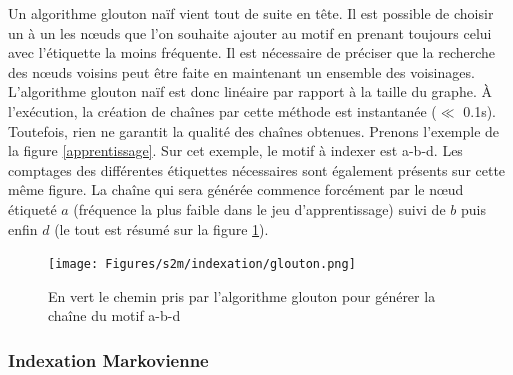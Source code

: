 % 
%  


Un algorithme glouton naïf vient tout de suite en tête.
Il est possible de choisir un à un les n\oe{}uds que l'on souhaite ajouter au motif en prenant toujours celui avec l'étiquette la moins fréquente.
Il est nécessaire de préciser que la recherche des n\oe{}uds voisins peut être faite en maintenant un ensemble des voisinages.
L'algorithme glouton naïf est donc linéaire par rapport à la taille du graphe.
À l'exécution, la création de chaînes par cette méthode est instantanée ($\ll$ 0.1s).
Toutefois, rien ne garantit la qualité des chaînes obtenues.
Prenons l'exemple de la figure \ref{apprentissage}.
Sur cet exemple, le motif à indexer est a-b-d.
Les comptages des différentes étiquettes nécessaires sont également présents sur cette même figure.
La chaîne qui sera générée commence forcément par le n\oe{}ud étiqueté $a$ (fréquence la plus faible dans le jeu d'apprentissage) suivi de $b$ puis enfin $d$ (le tout est résumé sur la figure \ref{glouton}).

\begin{figure}[!ht]
  \begin{center}
    \texttt{[image: Figures/s2m/indexation/glouton.png]}
    \caption{\label{glouton}En vert le chemin pris par l'algorithme glouton pour générer la chaîne du motif a-b-d}
  \end{center}
\end{figure}

\subsubsection{Indexation Markovienne}

